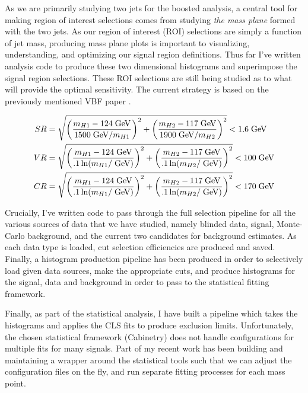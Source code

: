 \documentclass[12pt]{article}
\begin{document}
As we are primarily studying two jets for the boosted analysis, a central tool
for making region of interest selections comes from studying \textit{the mass
plane} formed with the two jets. As our region of interest (ROI) selections are
simply a function of jet mass, producing mass plane plots is important to
visualizing, understanding, and optimizing our signal region definitions. Thus
far I've written analysis code to produce these two dimensional histograms and
superimpose the signal region selections. These ROI selections are still being
studied as to what will provide the optimal sensitivity. The current strategy is
based on the previously mentioned VBF paper \cite{atlas_hhbbbb_vbf}.

\begin{align}
    SR &= \sqrt{\left( \frac{m_{H1}-124\;\text{GeV}}{1500\;\text{GeV}/m_{H1}}
    \right)^2 + \left( \frac{m_{H2}-117\;\text{GeV}}{1900\;\text{GeV}/m_{H2}}
    \right)^2} < 1.6 \;\text{GeV} \\
    VR &= \sqrt{\left( \frac{m_{H1}-124\;\text{GeV}}{.1\ln(m_{H1}/\;\text{GeV})}
    \right)^2 + \left( \frac{m_{H2}-117\;\text{GeV}}{.1\ln(m_{H2}/\;\text{GeV})}
    \right)^2} < 100 \;\text{GeV} \\
    CR &= \sqrt{\left( \frac{m_{H1}-124\;\text{GeV}}{.1\ln(m_{H1}/\;\text{GeV})}
    \right)^2 + \left( \frac{m_{H2}-117\;\text{GeV}}{.1\ln(m_{H2}/\;\text{GeV})}
    \right)^2} < 170 \;\text{GeV}
\end{align}

Crucially, I've written code to pass through the full selection pipeline for all
the various sources of data that we have studied, namely blinded data, signal,
Monte-Carlo background, and the current two candidates for background estimates.
As each data type is loaded, cut selection efficiencies are produced and saved.
Finally, a histogram production pipeline has been produced in order to
selectively load given data sources, make the appropriate cuts, and produce
histograms for the signal, data and background in order to pass to the
statistical fitting framework. %

Finally, as part of the statistical analysis, I have built a pipeline which
takes the histograms and applies the CLS fits to produce exclusion limits.
Unfortunately, the chosen statistical framework (Cabinetry) \cite{cabinetry}
does not handle configurations for multiple fits for many signals. Part of my
recent work has been building and maintaining a wrapper around the statistical
tools such that we can adjust the configuration files on the fly, and run
separate fitting processes for each mass point.
\end{document}
